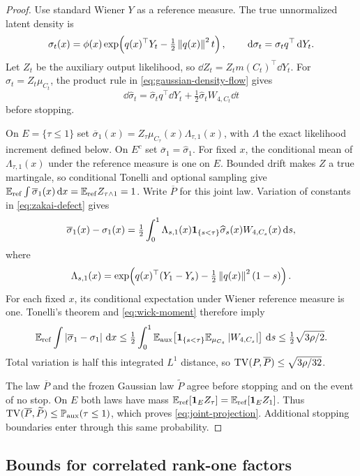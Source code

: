 \begin{proof}
Use standard Wiener $Y$ as a reference measure. The true unnormalized latent density is
\[
 \sigma_t(x)=\phi(x)
   \exp\!\left(q(x)^\top Y_t-\tfrac12\left\lVert q(x)\right\rVert^2t\right),
 \qquad \,\mathrm d\sigma_t=\sigma_t q^\top\,\mathrm d Y_t.
\]
Let $Z_t$ be the auxiliary output likelihood, so
$\dd Z_t=Z_tm(C_t)^\top\dd Y_t$.
For $\widehat\sigma_t=Z_t\mu_{C_t}$, the product rule in
\cref{eq:gaussian-density-flow} gives
\begin{equation}
 \dd\widehat\sigma_t
 =\widehat\sigma_tq^\top\dd Y_t
       +\tfrac12\widehat\sigma_tW_{4,C_t}\dd t
 \label{eq:zakai-defect}
\end{equation}
before stopping.

On $E=\{\tau\le1\}$ set $\overline\sigma_1(x)=Z_\tau\mu_{C_\tau}(x)\Lambda_{\tau,1}(x)$, with $\Lambda$ the exact likelihood increment defined below. On $E^c$ set $\overline\sigma_1=\widehat\sigma_1$. For fixed $x$, the conditional mean of $\Lambda_{\tau,1}(x)$ under the reference measure is one on $E$. Bounded drift makes $Z$ a true martingale, so conditional Tonelli and optional sampling give $\mathbb E_{\rm ref}\int\overline\sigma_1(x)\,\mathrm d x=\mathbb E_{\rm ref}Z_{\tau\wedge 1}=1$. Write $\overline P$ for this joint law. Variation of constants in \cref{eq:zakai-defect} gives
\[
 \overline\sigma_1(x)-\sigma_1(x)
 =\tfrac12\int_0^1
  \Lambda_{s,1}(x)\mathbf 1_{\{s<\tau\}}
  \widehat\sigma_s(x)W_{4,C_s}(x)\,\mathrm d s,
\]
where
\[
 \Lambda_{s,1}(x)=
 \exp\!\left(q(x)^\top(Y_1-Y_s)
       -\tfrac12\left\lVert q(x)\right\rVert^2(1-s)\right).
\]
For each fixed $x$, its conditional expectation under Wiener reference measure is one. Tonelli's theorem and \cref{eq:wick-moment} therefore imply
\[
 \mathbb E_{\mathrm{ref}}\int
   \left\lvert\overline\sigma_1-\sigma_1\right\rvert\,\mathrm d x
 \le\tfrac12\int_0^1
       \mathbb E_{\mathrm{aux}}\!\left[
        \mathbf 1_{\{s<\tau\}}\mathbb E_{\mu_{C_s}}\left\lvert W_{4,C_s}\right\rvert
       \right]\,\mathrm d s
 \le\tfrac12\sqrt{3\rho/2}.
\]
Total variation is half this integrated $L^1$ distance, so
$\operatorname{TV}(P,\overline P)\le\sqrt{3\rho/32}$.

The law $\overline P$ and the frozen Gaussian law $\widetilde P$ agree before stopping and on the event of no stop. On $E$ both laws have mass $\mathbb E_{\rm ref}[\mathbf 1_E Z_\tau]=\mathbb E_{\rm ref}[\mathbf 1_E Z_1]$. Thus
$\operatorname{TV}(\overline P,\widetilde P)\le\mathbb P_{\mathrm{aux}}(\tau\le1)$,
which proves \cref{eq:joint-projection}. Additional stopping boundaries enter through this same probability.
\end{proof}

\subsection{Bounds for correlated rank-one factors}

